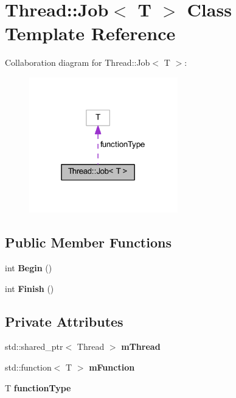 \hypertarget{class_thread_1_1_job}{}\section{Thread\+:\+:Job$<$ T $>$ Class Template Reference}
\label{class_thread_1_1_job}


Collaboration diagram for Thread\+:\+:Job$<$ T $>$\+:
\nopagebreak
\begin{figure}[H]
\begin{center}
\leavevmode
\includegraphics[width=183pt]{class_thread_1_1_job__coll__graph}
\end{center}
\end{figure}
\subsection*{Public Member Functions}
\begin{DoxyCompactItemize}
\item 
int {\bfseries Begin} ()\hypertarget{class_thread_1_1_job_a7be347617e4125390298491976176f4d}{}\label{class_thread_1_1_job_a7be347617e4125390298491976176f4d}

\item 
int {\bfseries Finish} ()\hypertarget{class_thread_1_1_job_aabf96ee68a4917da6cc7dec07f976502}{}\label{class_thread_1_1_job_aabf96ee68a4917da6cc7dec07f976502}

\end{DoxyCompactItemize}
\subsection*{Private Attributes}
\begin{DoxyCompactItemize}
\item 
std\+::shared\+\_\+ptr$<$ Thread $>$ {\bfseries m\+Thread}\hypertarget{class_thread_1_1_job_a7507a46d46adedc70d4c579f12012a25}{}\label{class_thread_1_1_job_a7507a46d46adedc70d4c579f12012a25}

\item 
std\+::function$<$ T $>$ {\bfseries m\+Function}\hypertarget{class_thread_1_1_job_a9d8b19e5e3b47e790266a0e79eee56e7}{}\label{class_thread_1_1_job_a9d8b19e5e3b47e790266a0e79eee56e7}

\item 
T {\bfseries function\+Type}\hypertarget{class_thread_1_1_job_adb49d85ea08e42c1e2f9b10d9823ede7}{}\label{class_thread_1_1_job_adb49d85ea08e42c1e2f9b10d9823ede7}

\end{DoxyCompactItemize}


